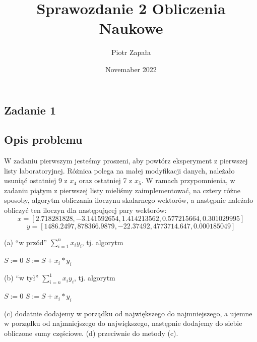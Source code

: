 \documentclass{article}
\title{Sprawozdanie 2 Obliczenia Naukowe}
\author{Piotr Zapała}
\date{Novemaber 2022}
\begin{document}
\maketitle
\graphicspath{ {/Users/piotrzapala/JPG}{/Users/piotrzapala/JPG} }

\tableofcontents
\newpage
\begin{center}
    \section{Zadanie 1}
    \subsection{Opis problemu}
    \large W zadaniu pierwszym jesteśmy proszeni, aby powtórz eksperyment z pierwszej listy laboratoryjnej. Różnica polega na małej modyfikacji danych, należało usuniąć ostatniej 9 z \(x_{4}\) oraz ostatniej 7 z \(x_{5}\).
     W ramach przypomnienia, w zadaniu piątym z pierwszej listy mieliśmy zaimplementować, na cztery różne sposoby, algorytm obliczania iloczynu skalarnego 
     wektorów, a następnie należało obliczyć ten iloczyn dla następującej pary wektorów:
    \[\displaystyle x = [2.718281828, -3.141592654, 1.414213562, 0.577215664, 0.301029995]\]
    \[\displaystyle y = [1486.2497, 878366.9879, -22.37492, 4773714.647, 0.000185049]\]
    \begin{flushleft}
       \vspace*{1cm}
       (a) ``w przód'' \(\textstyle \sum_{i=1}^n x_{i}y_{i}\), tj. algorytm
       \begin{algorithmic}
       \State$S:=0$
           \State $S:=S+x_{i}*y_{i}$
       \EndFor
       \end{algorithmic}
       \vspace*{1cm}
       (b) ``w tył'' \(\textstyle \sum_{i=n}^1 x_{i}y_{i}\), tj. algorytm
       \begin{algorithmic}
           \State$S:=0$
               \State $S:=S+x_{i}*y_{i}$
           \EndFor
           \end{algorithmic}
       \vspace*{1cm}
       (c) dodatnie dodajemy w porządku od największego do najmniejszego, a ujemne w porządku od najmniejszego do największego,
       następnie dodajemy do siebie obliczone sumy częściowe.\newline
       (d) przeciwnie do metody (c). 
    \end{flushleft}

\end{center}
\end{document}
